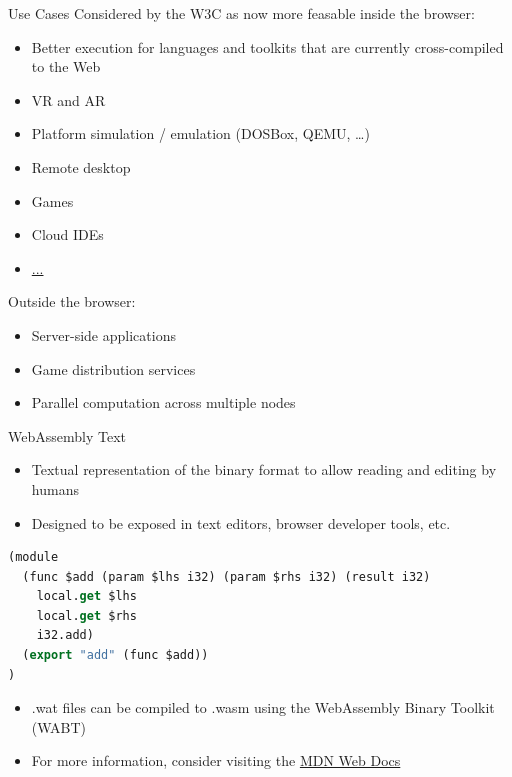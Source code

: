 \documentclass{beamer}
\begin{document}
\begin{frame}{Use Cases}
    Considered by the W3C as now more feasable inside the browser:
    \begin{itemize}
        \item Better execution for languages and toolkits that are currently cross-compiled to the Web
        \item VR and AR
        \item Platform simulation / emulation (DOSBox, QEMU, …)
        \item Remote desktop
        \item Games
        \item Cloud IDEs
        \item \href{https://webassembly.org/docs/use-cases/}{...}
    \end{itemize}
    Outside the browser:
    \begin{itemize}
        \item Server-side applications
        \item Game distribution services
        \item Parallel computation across multiple nodes
    \end{itemize}
\end{frame}

\begin{frame}[fragile]{WebAssembly Text}
    \begin{itemize}
        \item Textual representation of the binary format to allow reading and editing by humans
        \item Designed to be exposed in text editors, browser developer tools, etc.
    \end{itemize}
    \begin{lstlisting}[language=Lisp,basicstyle=\footnotesize]
(module
  (func $add (param $lhs i32) (param $rhs i32) (result i32)
    local.get $lhs
    local.get $rhs
    i32.add)
  (export "add" (func $add))
)
    \end{lstlisting}
    \begin{itemize}
        \item .wat files can be compiled to .wasm using the WebAssembly Binary Toolkit (WABT)
        \item For more information, consider visiting the \href{https://developer.mozilla.org/en-US/docs/WebAssembly/Understanding_the_text_format}{MDN Web Docs}
    \end{itemize}
\end{frame}
\end{document}
